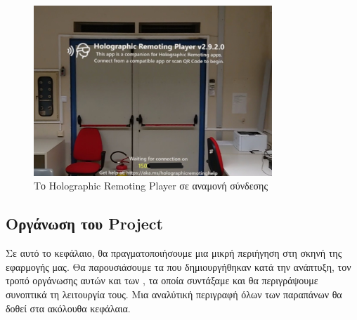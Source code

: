 \begin{figure}[!hb]
    \centering
    \includegraphics[width=0.8\textwidth]{images/develop_holographicRemotingPlayer.jpg}
    \caption{Το Holographic Remoting Player σε αναμονή σύνδεσης}\label{fig:developHolographicRemotingPlayer}
\end{figure}

\subsection{Οργάνωση του Project}\label{subsec:developOrganization}
Σε αυτό το κεφάλαιο, θα πραγματοποιήσουμε μια μικρή περιήγηση στη σκηνή της εφαρμογής μας. Θα παρουσιάσουμε τα  που δημιουργήθηκαν κατά την ανάπτυξη, τον τροπό οργάνωσης αυτών και των , τα οποία συντάξαμε και θα περιγράψουμε συνοπτικά τη λειτουργία τους. Μια αναλύτική περιγραφή όλων των παραπάνων θα δοθεί στα ακόλουθα κεφάλαια.


